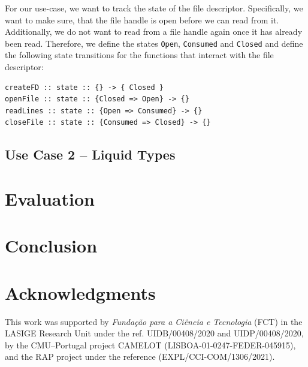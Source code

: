 \documentclass[acmsmall, review, screen]{acmart}
\begin{document}
For our use-case, we want to track the state of the file descriptor. Specifically, we want to make sure, that the file handle is open before we can read from it. Additionally, we do not want to read from a file handle again once it has already been read. Therefore, we define the states \texttt{Open}, \texttt{Consumed} and \texttt{Closed} and define the following state transitions for the functions that interact with the file descriptor:

\begin{lstlisting}
createFD :: state :: {} -> { Closed }
openFile :: state :: {Closed => Open} -> {}
readLines :: state :: {Open => Consumed} -> {}
closeFile :: state :: {Consumed => Closed} -> {}
\end{lstlisting}

\subsection{Use Case 2 -- Liquid Types}
\label{sssec:use_case_2}

\section{Evaluation}
\label{sec:evaluation}
\section{Conclusion}
\label{sec:conclusion}
\section{Acknowledgments}
\label{sec:acknowledgments}
This work was supported by \textit{Fundação para a Ciência e Tecnologia} (FCT) in the LASIGE Research Unit under the ref. UIDB/00408/2020 and UIDP/00408/2020, by the CMU--Portugal project CAMELOT (LISBOA-01-0247-FEDER-045915), and the RAP project under the reference (EXPL/CCI-COM/1306/2021).
\end{document}

